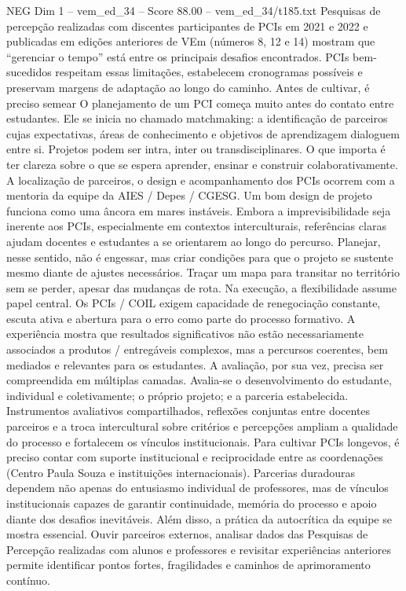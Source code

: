 \begin{textsample}{NEG Dim 1 – vem\_ed\_34 – Score 88.00 – vem\_ed\_34/t185.txt}
Pesquisas de percepção realizadas com discentes participantes de PCIs em 2021 e 2022 e publicadas em edições anteriores de VEm (números 8, 12 e 14) mostram que “gerenciar o tempo” está entre os principais desafios encontrados.
PCIs bem-sucedidos respeitam essas limitações, estabelecem cronogramas possíveis e preservam margens de adaptação ao longo do caminho.
Antes de cultivar, é preciso semear O planejamento de um PCI começa muito antes do contato entre estudantes.
Ele se inicia no chamado matchmaking: a identificação de parceiros cujas expectativas, áreas de conhecimento e objetivos de aprendizagem dialoguem entre si.
Projetos podem ser intra, inter ou transdisciplinares.
O que importa é ter clareza sobre o que se espera aprender, ensinar e construir colaborativamente.
A localização de parceiros, o design e acompanhamento dos PCIs ocorrem com a mentoria da equipe da AIES / Depes / CGESG.
Um bom design de projeto funciona como uma âncora em mares instáveis.
Embora a imprevisibilidade seja inerente aos PCIs, especialmente em contextos interculturais, referências claras ajudam docentes e estudantes a se orientarem ao longo do percurso.
Planejar, nesse sentido, não é engessar, mas criar condições para que o projeto se sustente mesmo diante de ajustes necessários.
Traçar um mapa para transitar no território sem se perder, apesar das mudanças de rota.
Na execução, a flexibilidade assume papel central.
Os PCIs / COIL exigem capacidade de renegociação constante, escuta ativa e abertura para o erro como parte do processo formativo.
A experiência mostra que resultados significativos não estão necessariamente associados a produtos / entregáveis complexos, mas a percursos coerentes, bem mediados e relevantes para os estudantes.
A avaliação, por sua vez, precisa ser compreendida em múltiplas camadas.
Avalia-se o desenvolvimento do estudante, individual e coletivamente; o próprio projeto; e a parceria estabelecida.
Instrumentos avaliativos compartilhados, reflexões conjuntas entre docentes parceiros e a troca intercultural sobre critérios e percepções ampliam a qualidade do processo e fortalecem os vínculos institucionais.
Para cultivar PCIs longevos, é preciso contar com suporte institucional e reciprocidade entre as coordenações (Centro Paula Souza e instituições internacionais).
Parcerias duradouras dependem não apenas do entusiasmo individual de professores, mas de vínculos institucionais capazes de garantir continuidade, memória do processo e apoio diante dos desafios inevitáveis.
Além disso, a prática da autocrítica da equipe se mostra essencial.
Ouvir parceiros externos, analisar dados das Pesquisas de Percepção realizadas com alunos e professores e revisitar experiências anteriores permite identificar pontos fortes, fragilidades e caminhos de aprimoramento contínuo.

\end{textsample}
